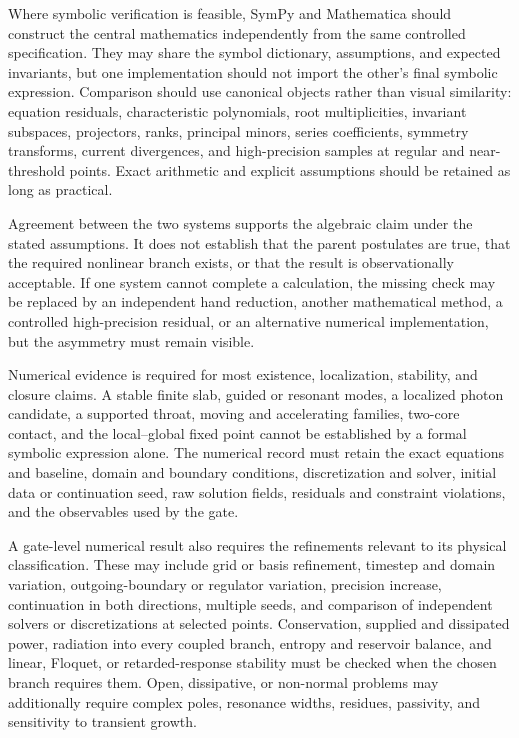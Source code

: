 Where symbolic verification is feasible, SymPy and Mathematica should construct
the central mathematics independently from the same controlled specification.
They may share the symbol dictionary, assumptions, and expected invariants, but
one implementation should not import the other's final symbolic expression.
Comparison should use canonical objects rather than visual similarity: equation
residuals, characteristic polynomials, root multiplicities, invariant
subspaces, projectors, ranks, principal minors, series coefficients, symmetry
transforms, current divergences, and high-precision samples at regular and
near-threshold points. Exact arithmetic and explicit assumptions should be
retained as long as practical.

Agreement between the two systems supports the algebraic claim under the stated
assumptions. It does not establish that the parent postulates are true, that the
required nonlinear branch exists, or that the result is observationally
acceptable. If one system cannot complete a calculation, the missing check may
be replaced by an independent hand reduction, another mathematical method, a
controlled high-precision residual, or an alternative numerical implementation,
but the asymmetry must remain visible.

Numerical evidence is required for most existence, localization, stability, and
closure claims. A stable finite slab, guided or resonant modes, a localized
photon candidate, a supported throat, moving and accelerating families,
two-core contact, and the local--global fixed point cannot be established by a
formal symbolic expression alone. The numerical record must retain the exact
equations and baseline, domain and boundary conditions, discretization and
solver, initial data or continuation seed, raw solution fields, residuals and
constraint violations, and the observables used by the gate.

A gate-level numerical result also requires the refinements relevant to its
physical classification. These may include grid or basis refinement, timestep
and domain variation, outgoing-boundary or regulator variation, precision
increase, continuation in both directions, multiple seeds, and comparison of
independent solvers or discretizations at selected points. Conservation,
supplied and dissipated power, radiation into every coupled branch, entropy and
reservoir balance, and linear, Floquet, or retarded-response stability must be
checked when the chosen branch requires them. Open, dissipative, or non-normal
problems may additionally require complex poles, resonance widths, residues,
passivity, and sensitivity to transient growth.


